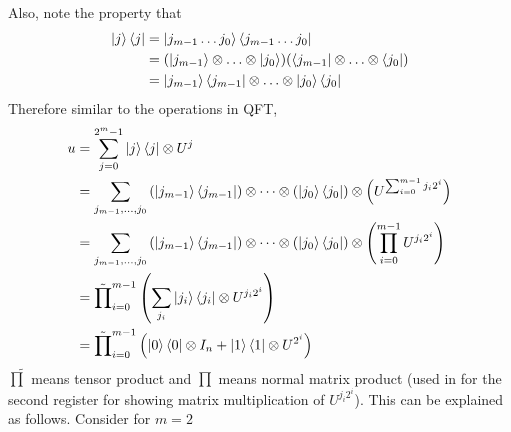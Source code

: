 Also, note the property that 
\begin{align*}
    \ket{j}\bra{j} &= \ket{j_{m-1}\ldots j_0}\bra{j_{m-1}\ldots j_0}\\
    &= (\ket{j_{m-1}}\otimes \ldots \otimes \ket{j_0})(\bra{j_{m-1}}\otimes \ldots \otimes \bra{j_0})\\
    &= \ket{j_{m-1}}\bra{j_{m-1}} \otimes \ldots \otimes \ket{j_0}\bra{j_0}
\end{align*}
Therefore similar to the operations in QFT,
\begin{align*}
    u &= \sum_{j=0}^{2^m-1} \ket{j}\bra{j} \otimes U^j \\
    &= \sum_{j_{m-1}, \ldots, j_0} \left(\ket{j_{m-1}} \bra{j_{m-1}}\right) \otimes \cdots \otimes \left(\ket{j_0} \bra{j_0}\right) \otimes \left(U^{\sum_{i=0}^{m-1}j_i2^i} \right) \\
    &= \sum_{j_{m-1}, \ldots, j_0} \left(\ket{j_{m-1}} \bra{j_{m-1}}\right) \otimes \cdots \otimes \left(\ket{j_0} \bra{j_0}\right) \otimes \left(\prod_{i=0}^{m-1} U^{j_i2^i} \right) \\
    &= \tilde{\prod}_{i=0}^{m-1} \left( \sum_{j_i} \ket{j_i}\bra{j_i} \otimes U^{j_i 2^i} \right) \\
    &= \tilde{\prod}_{i=0}^{m-1} \left( \ket{0}\bra{0} \otimes I_n + \ket{1}\bra{1} \otimes U^{2^i} \right)
\end{align*}
$\tilde{\prod}$ means tensor product and $\prod$ means normal matrix product (used in for the second register for showing matrix multiplication of $U^{j_i2^i}$).
This can be explained as follows. Consider for $m=2$
